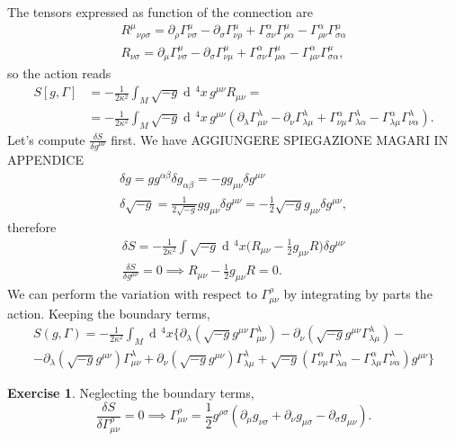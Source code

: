 \documentclass[a4paper,12pt]{book}
\newcommand{\dd}{\mathop{\mathrm{d}\!}{}}
\theoremstyle{definition}
\newtheorem{exercise}{Exercise}
\theoremstyle{remark}
\begin{document}
The tensors expressed as function of the connection are
\begin{gather*}
R^\mu{}_{\nu\rho\sigma}=\partial_\rho\Gamma^\mu_{\nu\sigma}-\partial_\sigma\Gamma^\mu_{\nu\rho}+\Gamma^\alpha_{\sigma\nu}\Gamma^\mu_{\rho\alpha}-\Gamma^\alpha_{\rho\nu}\Gamma^\mu_{\sigma\alpha}\\
R_{\nu\sigma}=\partial_\mu\Gamma^\mu_{\nu\sigma}-\partial_\sigma\Gamma^\mu_{\nu\mu}+\Gamma^\alpha_{\sigma\nu}\Gamma^\mu_{\mu\alpha}-\Gamma^\alpha_{\mu\nu}\Gamma^\mu_{\sigma\alpha},
\end{gather*}
so the action reads
\begin{align*}
S[g,\Gamma]&=-\frac1{2\kappa^2}\int_M\sqrt{-g}\dd^4x\,g^{\mu\nu}R_{\mu\nu}=\\
&=-\frac1{2\kappa^2}\int_M\sqrt{-g}\dd^4x\,g^{\mu\nu}(\partial_\lambda\Gamma^\lambda_{\mu\nu}-\partial_\nu\Gamma^\lambda_{\lambda\mu}+\Gamma^\alpha_{\nu\mu}\Gamma^\lambda_{\lambda\alpha}-\Gamma^\alpha_{\lambda\mu}\Gamma^\lambda_{\nu\alpha}).
\end{align*}
Let's compute $\frac{\delta S}{\delta g^{\mu\nu}}$ first. We have AGGIUNGERE SPIEGAZIONE MAGARI IN APPENDICE
\begin{gather*}
\delta g=gg^{\alpha\beta}\delta g_{\alpha\beta}=-gg_{\mu\nu}\delta g^{\mu\nu}\\
\delta\sqrt{-g}=\frac1{2\sqrt{-g}}gg_{\mu\nu}\delta g^{\mu\nu}=-\frac12\sqrt{-g}g_{\mu\nu}\delta g^{\mu\nu},
\end{gather*}
therefore
\begin{gather*}
\delta S=-\frac1{2\kappa^2}\int\sqrt{-g}\dd^4x\biggl(R_{\mu\nu}-\frac12g_{\mu\nu}R\biggr)\delta g^{\mu\nu}\\
\frac{\delta S}{\delta g^{\mu\nu}}=0\implies R_{\mu\nu}-\frac12g_{\mu\nu}R=0.
\end{gather*}
We can perform the variation with respect to $\Gamma^\rho_{\mu\nu}$ by integrating by parts the action. Keeping the boundary terms,
\begin{multline*}
S(g,\Gamma)=-\frac1{2\kappa^2}\int_M\dd^4x\bigl\{\partial_\lambda(\sqrt{-g}g^{\mu\nu}\Gamma^\lambda_{\mu\nu})-\partial_\nu(\sqrt{-g}g^{\mu\nu}\Gamma^\lambda_{\lambda\mu})-{}\\
-\partial_\lambda(\sqrt{-g}g^{\mu\nu})\Gamma^\lambda_{\mu\nu}+\partial_\nu(\sqrt{-g}g^{\mu\nu})\Gamma^\lambda_{\lambda\mu}+\sqrt{-g}(\Gamma^\alpha_{\nu\mu}\Gamma^\lambda_{\lambda\alpha}-\Gamma^\alpha_{\lambda\mu}\Gamma^\lambda_{\nu\alpha})g^{\mu\nu}\bigr\}
\end{multline*}
\begin{exercise}
\label{thm:varGamma}
Neglecting the boundary terms,
\[\frac{\delta S}{\delta\Gamma^\rho_{\mu\nu}}=0\implies\Gamma^\rho_{\mu\nu}=\frac12g^{\rho\sigma}(\partial_\mu g_{\nu\sigma}+\partial_\nu g_{\mu\sigma}-\partial_\sigma g_{\mu\nu}).\]
\end{exercise}
\end{document}
